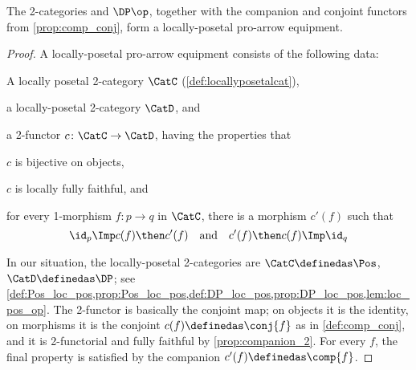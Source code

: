 \begin{theorem}
  The 2-categories \Pos and $\DP\op$, together with the companion and conjoint functors from \cref{prop:comp_conj}, form a locally-posetal pro-arrow equipment.
\end{theorem}
\begin{proof}
  A locally-posetal pro-arrow equipment consists of the following data:
  \begin{compactitem}
    \item A locally posetal 2-category $\CatC$ (\cref{def:locallyposetalcat}),
    \item a locally-posetal 2-category $\CatD$, and
    \item a 2-functor $c\colon\CatC\to\CatD$, having the properties that
    \begin{compactitem}
      \item $c$ is bijective on objects,
      \item $c$ is locally fully faithful, and
      \item for every 1-morphism $f\colon p\to q$ in $\CatC$, there is a morphism $c'(f)$ such that
      \begin{equation}
        \id_p\Imp c(f)\then c'(f)\quad\text{and}\quad c'(f)\then c(f)\Imp\id_q
      \end{equation}
    \end{compactitem}
  \end{compactitem}
  In our situation, the locally-posetal 2-categories are $\CatC\definedas\Pos$, $\CatD\definedas\DP$; see \cref{def:Pos_loc_pos,prop:Pos_loc_pos,def:DP_loc_pos,prop:DP_loc_pos,lem:loc_pos_op}. The 2-functor is basically the conjoint map; on objects it is the identity, on morphisms it is the conjoint $c(f)\definedas\conj{f}$ as in \cref{def:comp_conj}, and it is 2-functorial and fully faithful by \cref{prop:companion_2}. For every $f$, the final property is satisfied by the companion $c'(f)\definedas \comp{f}$.
\end{proof}


